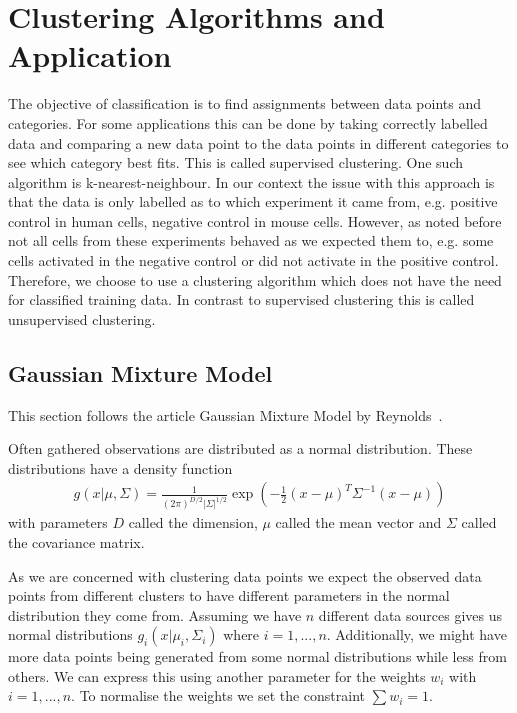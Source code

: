 \chapter{Clustering Algorithms and Application}
\label{chapter:clustering}

The objective of classification is to find assignments between data points and categories. For some applications this can be done by taking correctly labelled data and comparing a new data point to the data points in different categories to see which category best fits. This is called supervised clustering. One such algorithm is k-nearest-neighbour. In our context the issue with this approach is that the data is only labelled as to which experiment it came from, e.g. positive control in human cells, negative control in mouse cells. However, as noted before not all cells from these experiments behaved as we expected them to, e.g. some cells activated in the negative control or did not activate in the positive control. Therefore, we choose to use a clustering algorithm which does not have the need for classified training data. In contrast to supervised clustering this is called unsupervised clustering.

\section{Gaussian Mixture Model}
\label{sec:gaussian_mixture_model}

This section follows the article Gaussian Mixture Model by Reynolds~\cite{reynolds2009}.

Often gathered observations are distributed as a normal distribution. These distributions have a density function
\begin{align*}
	g(x|\mu, \Sigma) = \frac{1}{(2\pi)^{D/2} |\Sigma|^{1/2}} \exp\left( - \frac{1}{2} (x-\mu)^T \Sigma^{-1} (x-\mu) \right)
\end{align*}
with parameters $D$ called the dimension, $\mu$ called the mean vector and $\Sigma$ called the covariance matrix.

As we are concerned with clustering data points we expect the observed data points from different clusters to have different parameters in the normal distribution they come from. Assuming we have $n$ different data sources gives us normal distributions $g_i(x|\mu_i, \Sigma_i)$ where $i=1, ..., n$. Additionally, we might have more data points being generated from some normal distributions while less from others. We can express this using another parameter for the weights $w_i$ with $i=1, ..., n$. To normalise the weights we set the constraint $\sum w_i = 1$.

